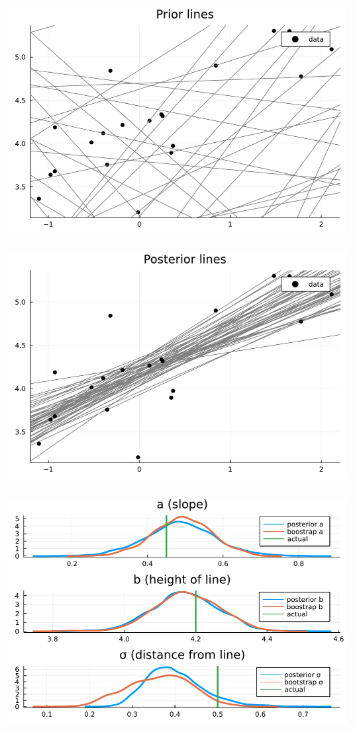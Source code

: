\documentclass[aspectratio=169,xcolor=svgnames]{beamer}
\begin{document}
\begin{frame}
  \begin{figure}[ht]
    \centering
    \includegraphics[width=0.8\textwidth]{figures/linear_prior_lines.pdf}
    \caption{\label{fig:label} }
  \end{figure}
\end{frame}

\begin{frame}
  \begin{figure}[ht]
    \centering
    \includegraphics[width=0.8\textwidth]{figures/posterior_lines.pdf}
    \caption{\label{fig:label} }
  \end{figure}
\end{frame}

\begin{frame}
\begin{figure}[ht]
  \centering
  \includegraphics[width=0.8\textwidth]{figures/posterior_parameters.pdf}
  \caption{\label{fig:label} }
\end{figure}
\end{frame}
\end{document}

